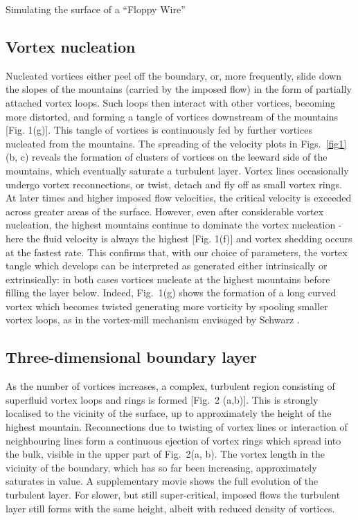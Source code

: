 \begin{chapter}{\label{cha:afm}Simulating the surface of a ``Floppy Wire''}
\subsection{Vortex nucleation}
Nucleated vortices either peel off the boundary, or, more frequently, slide
down the slopes of the mountains (carried by the imposed flow) in the form of partially attached vortex loops.
Such loops then interact with other vortices, becoming more distorted, and forming a tangle of vortices downstream of the mountains [Fig. 1(g)].  This tangle of vortices is continuously fed by further vortices nucleated from the mountains.  The spreading of the velocity plots in Figs.~\ref{fig1} (b, c) reveals
the formation of clusters of vortices on the leeward side of the mountains, which eventually saturate a
turbulent layer.  Vortex lines occasionally undergo vortex reconnections, or twist, detach and fly off as small 
vortex rings. At later times and higher imposed flow velocities, the critical velocity is exceeded across greater areas of the surface.  However, even after considerable vortex nucleation, the highest mountains continue to dominate the vortex nucleation - here the fluid velocity is always the highest [Fig. 1(f)] and vortex shedding occurs at the fastest rate. This confirms that, with our choice of parameters,
the vortex tangle which develops can be interpreted as generated either
intrinsically or extrinsically: in both cases vortices nucleate 
at the highest mountains before filling the layer below.
Indeed, Fig.~1(g) shows the formation of a long curved
vortex which becomes twisted generating more vorticity  by spooling smaller vortex loops, 
as in the vortex-mill mechanism envisaged by Schwarz \cite{Schwarz-mill}.

\subsection{Three-dimensional boundary layer}
As the number of vortices increases, a complex,
turbulent region consisting of superfluid vortex loops and rings is 
formed [Fig.~2 (a,b)].  This is strongly localised to the vicinity of the surface, up to approximately the height of the highest mountain. Reconnections due to twisting of vortex lines or interaction of neighbouring lines form a continuous ejection of vortex rings which spread into the bulk, visible in
the upper part of Fig.~2(a, b). The vortex length in the vicinity of the boundary, which has so far been increasing, approximately saturates in value. {A supplementary movie \cite{supp} shows the full evolution of the turbulent layer.}   For slower, but still super-critical, imposed flows the turbulent layer still forms with the same height, albeit with reduced density of vortices.


\end{chapter}
